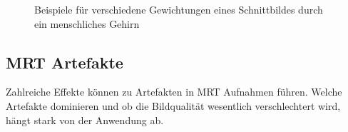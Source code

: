 \begin{figure}[H]
	\centering
	\hfill
	\hfill
	\caption[Beispiele für unterschiedlich gewichtete Spinecho-Aufnahmen]{Beispiele für verschiedene Gewichtungen eines Schnittbildes durch ein menschliches Gehirn \cite[S.~424ff]{Bushberg2011}}
	\label{fig:BildgewichtungenBsp}
\end{figure}





\subsection{MRT Artefakte}
Zahlreiche Effekte können zu Artefakten in MRT Aufnahmen führen. Welche Artefakte dominieren und ob die Bildqualität wesentlich verschlechtert wird, hängt stark von der Anwendung ab.

